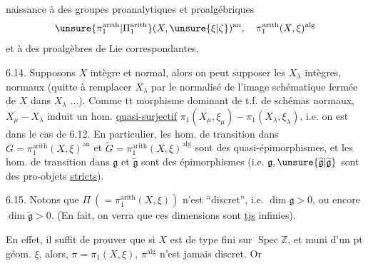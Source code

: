 naissance à des groupes proanalytiques et proalgébriques
\[
\unsure{\pi_1^{\mathrm{arith}}|\Pi_1^{\mathrm{arith}}}(X,\unsure{\xi|\zeta})^{\mathrm{an}},\quad
\pi_1^{\mathrm{arith}}(X,\xi)^{\mathrm{alg}}
\]
et à des proalgèbres de Lie correspondantes.

6.14. Supposons $X$ intègre et normal, alors on peut supposer les
$X_\lambda$ intègres, normaux (quitte à  remplacer $X_\lambda$
par le normalisé de l'image schématique fermée de $X$ dans $X_\lambda$
$\ldots$). 
Comme  tt morphisme dominant de t.f. de schémas normaux,
$X_\mu\mathbin{-}X_\lambda$ induit un  hom.
\uline{quasi-surjectif}
$\pi_1(X_\mu,\xi_\mu)\mathbin{-}\pi_1(X_\lambda,\xi_\lambda)$,
i.e. on est dans le cas de 6.12. En particulier, les  hom.
de transition dans \deleted{$\unsure{\Pi}$}
$G=\pi_1^{\mathrm{arith}}(X,\xi)^{\mathrm{an}}$ et
$\widetilde{G}=\pi_1^{\mathrm{arith}}(X,\xi)^{\mathrm{alg}}$ sont des
quasi-épimorphismes, et les hom. de transition dans $\mathfrak{g}$ et
$\widetilde{\mathfrak{g}}$ sont des épimorphismes (i.e.
$\mathfrak{g},\unsure{\widehat{\mathfrak{g}}|\widetilde{\mathfrak{g}}}$
sont des pro-objets \uline{stricts}).

6.15. Notons que 
$\Pi\ (=\pi_1^{\mathrm{arith}}(X,\xi))$
n'est  ``discret'', i.e.
 $\dim\mathfrak{g}>0$,
 ou encore
$\dim\widetilde{\mathfrak{g}}>0$. (En fait, on verra que ces dimensions
sont \uline{tjs} infinies).

En effet, il suffit de prouver que si 
$X$ est de type fini sur $\operatorname{Spec}\mathbb{Z}$, et muni d'un
pt géom. $\xi$,  alors,
 
$\pi=\pi_1(X,\xi)$, $\pi^{\mathrm{alg}}$ n'est jamais discret. Or
